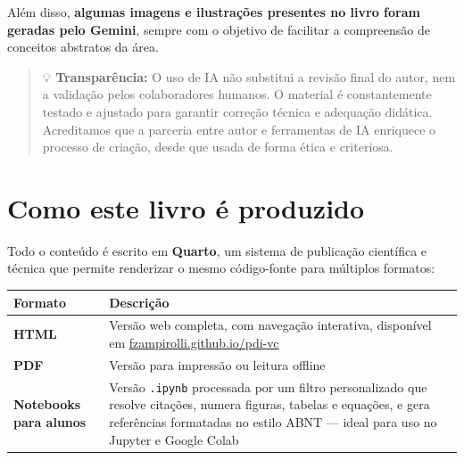\documentclass[
  portuguese,
  letterpaper,
  openany,
  oneside,
  12pt,
  a4paper]{book}
\begin{document}
Além disso, \textbf{algumas imagens e ilustrações presentes no livro
foram geradas pelo Gemini}, sempre com o objetivo de facilitar a
compreensão de conceitos abstratos da área.

\begin{quote}
💡 \textbf{Transparência:} O uso de IA não substitui a revisão final do
autor, nem a validação pelos colaboradores humanos. O material é
constantemente testado e ajustado para garantir correção técnica e
adequação didática. Acreditamos que a parceria entre autor e ferramentas
de IA enriquece o processo de criação, desde que usada de forma ética e
criteriosa.
\end{quote}

\section*{Como este livro é
produzido}\label{como-este-livro-uxe9-produzido}


Todo o conteúdo é escrito em \textbf{Quarto}, um sistema de publicação
científica e técnica que permite renderizar o mesmo código-fonte para
múltiplos formatos:

\begin{longtable}[]{@{}
  >{\raggedright\arraybackslash}p{}
  >{\raggedright\arraybackslash}p{}@{}}
\toprule\noalign{}
\begin{minipage}[b]{\linewidth}\raggedright
Formato
\end{minipage} & \begin{minipage}[b]{\linewidth}\raggedright
Descrição
\end{minipage} \\
\midrule\noalign{}
\endhead
\bottomrule\noalign{}
\endlastfoot
\textbf{HTML} & Versão web completa, com navegação interativa,
disponível em
\href{https://fzampirolli.github.io/pdi-vc/}{fzampirolli.github.io/pdi-vc} \\
\textbf{PDF} & Versão para impressão ou leitura offline \\
\textbf{Notebooks para alunos} & Versão \texttt{.ipynb} processada por
um filtro personalizado que resolve citações, numera figuras, tabelas e
equações, e gera referências formatadas no estilo ABNT --- ideal para
uso no Jupyter e Google Colab \\
\end{longtable}
\end{document}

